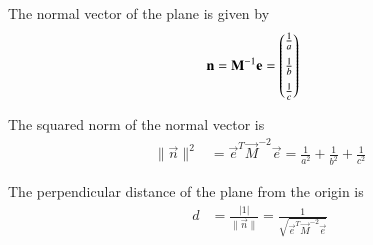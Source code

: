 \documentclass[journal]{IEEEtran}
\begin{document}
The normal vector of the plane is given by
\begin{align}
\mathbf{n} &= \mathbf{M}^{-1} \mathbf{e} 
= \begin{pmatrix} \tfrac{1}{a} \\[6pt] \tfrac{1}{b} \\[6pt] \tfrac{1}{c} \end{pmatrix}
\end{align}

The squared norm of the normal vector is
\begin{align}
\|\vec{n}\|^2 &= \vec{e}^T \vec{M}^{-2} \vec{e} 
= \frac{1}{a^2} + \frac{1}{b^2} + \frac{1}{c^2}
\end{align}

The perpendicular distance of the plane from the origin is
\begin{align}
d &= \frac{|1|}{\|\vec{n}\|} 
= \frac{1}{\sqrt{\vec{e}^T \vec{M}^{-2} \vec{e}}}
\end{align}
\end{document}
